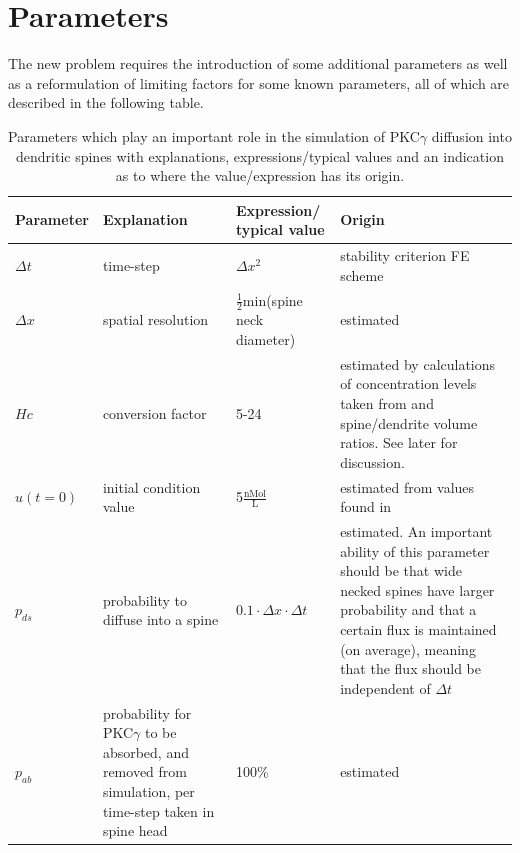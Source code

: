 \clearpage

\section{Parameters}

The new problem requires the introduction of some additional parameters as well as a reformulation of limiting factors for some known parameters, all of which are described in the following table.
 
 \begin{table}[H]
\centering
\begin{tabular}{|p{}|p{}|p{}|p{}|}
\hline
\textbf{Parameter} & \textbf{Explanation} &\textbf{Expression/ typical value}& \textbf{Origin} \\
\hline
$\Delta t$ & time-step & $\Delta x^2$ & stability criterion FE scheme \\
\hline
$\Delta x$ & spatial resolution & $\frac{1}{2}$min(spine neck diameter) & estimated \\
\hline
$Hc$ & conversion factor & 5-24 & estimated by calculations of concentration levels taken from \cite{light1996protein} and spine/dendrite volume ratios. See later for discussion. \\
\hline
$u(t=0)$ & initial condition value & 5$\frac{\text{nMol}}{\text{L}}$ & estimated from values found in \cite{light1996protein}\\
\hline
$p_{ds}$ & probability to diffuse into a spine & $0.1\cdot\Delta x\cdot\Delta t$& estimated. An important ability of this parameter should be that wide necked spines have larger probability and that a certain flux is maintained (on average), meaning that the flux should be independent of $\Delta t$ \\
\hline
$p_{ab}$ & probability for PKC$\gamma$ to be absorbed, and removed from simulation, per time-step taken in spine head & 100\% & estimated\\
\hline
\end{tabular}
\caption[Important parameters]{Parameters which play an important role in the simulation of PKC$\gamma$ diffusion into dendritic spines with explanations, expressions/typical values and an indication as to where the value/expression has its origin.}
\label{table:parameters}
\end{table}
